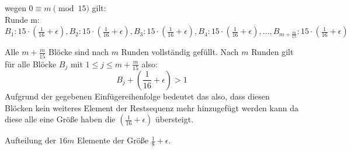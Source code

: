 \documentclass{article}
\begin{document}
wegen $0 \equiv m \pmod{15}$ gilt:\\
Runde m: $B_{1}: 15\cdot(\frac{1}{16}+\epsilon), B_{2}:15\cdot(\frac{1}{16}+\epsilon), B_{3}: 15\cdot(\frac{1}{16}+\epsilon),B_{4}: 15\cdot(\frac{1}{16}+\epsilon), ...,B_{m+\frac{m}{15}}: 15\cdot(\frac{1}{16}+\epsilon) $

Alle $m+\frac{m}{15}$ Blöcke sind nach $m$ Runden vollständig gefüllt.
Nach $m$ Runden gilt für alle Blöcke $B_{j}$ mit $1\leq j \leq m+\frac{m}{15}$ also: 
\begin{equation}
B_{j} + (\frac{1}{16}+\epsilon) > 1
\end{equation}
Aufgrund der gegebenen Einfügereihenfolge  bedeutet das also, dass diesen Blöcken kein weiteres Element der Restsequenz mehr hinzugefügt werden kann da diese alle eine Größe haben die $(\frac{1}{16}+\epsilon)$ übersteigt.


Aufteilung der $16m$ Elemente der Größe  $\frac{1}{8}+\epsilon$. \\
\end{document}
